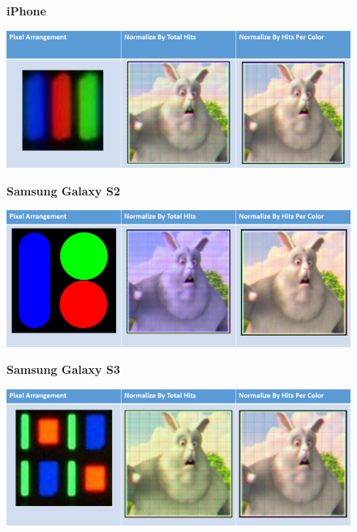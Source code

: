 \begin{figure}
    \centering
    \textbf{iPhone}\par\medskip
    \includegraphics[width=6in]{chapters/chapter7/images/iPhone.png}
\end{figure}

\begin{figure}
    \centering
    \textbf{Samsung Galaxy S2}\par\medskip
    \includegraphics[width=6in]{chapters/chapter7/images/Samsung_Galaxy_S2.png}
\end{figure}

\begin{figure}
    \centering
    \textbf{Samsung Galaxy S3}\par\medskip
    \includegraphics[width=6in]{chapters/chapter7/images/Samsung_Galaxy_S3.png}
\end{figure}

